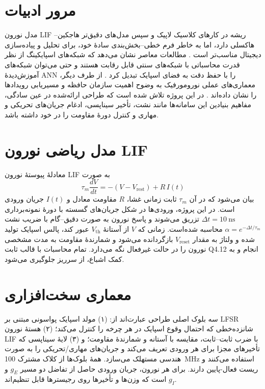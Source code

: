 \documentclass[12pt,a4paper]{article}
\begin{document}
\section{مرور ادبیات}
مدل نورون LIF ریشه در کارهای کلاسیک لاپیک و سپس مدل‌های دقیق‌تر هاجکین–هاکسلی دارد، اما به خاطر فرم خطی–بخش‌بندی سادهٔ خود، برای تحلیل و پیاده‌سازی دیجیتال مناسب‌تر است \cite{GerstnerKistler2002}. مطالعات معاصر نشان می‌دهد که شبکه‌های اسپایکینگ از نظر قدرت محاسباتی با شبکه‌های سنتی قابل رقابت هستند و حتی می‌توان شبکه‌های آموزش‌دیدهٔ ANN را با حفظ دقت به فضای اسپایک تبدیل کرد \cite{Rueckauer2017}. از طرف دیگر، معماری‌های عملی نورومورفیک به وضوح اهمیت سازمان حافظه و مسیریابی رویدادها را نشان داده‌اند \cite{IndiveriLiu2015,LinaresBarranco2011}. در این پروژه تلاش شده است که طراحی ارائه‌شده در عین سادگی، مفاهیم بنیادین این سامانه‌ها مانند نشت، تأخیر سیناپسی، ادغام جریان‌های تحریکی و مهاری و کنترل دورهٔ مقاومت را در خود داشته باشد.

\section{مدل ریاضی نورون LIF}
معادلهٔ پیوستهٔ نورون LIF به صورت
\[
\tau_m \frac{dV}{dt} = -(V - V_{\mathrm{rest}}) + R\,I(t)
\]
بیان می‌شود که در آن $\tau_m$ ثابت زمانی غشا، $R$ مقاومت معادل و $I(t)$ جریان ورودی است. در این پروژه، ورودی‌ها در شکل جریان‌های گسسته با دورهٔ نمونه‌برداری $\Delta t = 10\ \mathrm{ns}$ تزریق می‌شوند و پاسخ نورون به صورت دقیق–گام با ضریب نشت $\alpha = e^{-\Delta t/\tau_m}$ محاسبه شده‌است. زمانی که $V$ از آستانهٔ $V_{\mathrm{th}}$ عبور کند، پالس اسپایک تولید شده و ولتاژ به مقدار $V_{\mathrm{reset}}$ بازگردانده می‌شود و شمارندهٔ مقاومت به مدت مشخصی نورون را در حالت غیرفعال نگه می‌دارد. تمام محاسبات با قالب ثابت Q4.12 انجام و به کمک اشباع، از سرریز جلوگیری می‌شود.

\section{معماری سخت‌افزاری}
سه بلوک اصلی طراحی عبارت‌اند از: (۱) مولد اسپایک پواسونی مبتنی بر LFSR شانزده‌خطی که احتمال وقوع اسپایک در هر چرخه را کنترل می‌کند؛ (۲) هستهٔ نورون LIF با ضرب ثابت–ثابت، مقایسه با آستانه و شمارندهٔ مقاومت؛ و (۳) لایهٔ سیناپسی که تأخیرهای مجزا برای هر ورودی تعریف می‌کند و جریان‌های مهاری/تحریکی را به صورت هندسی مستهلک می‌سازد. همهٔ بلوک‌ها از کلاک مشترک 100~MHz استفاده می‌کنند و ریست فعال-پایین دارند. برای هر نورون، جریان ورودی حاصل از تفاضل دو مسیر $g_E$ و $g_I$ است که وزن‌ها و تأخیرها روی رجیسترها قابل تنظیم‌اند.
\end{document}
